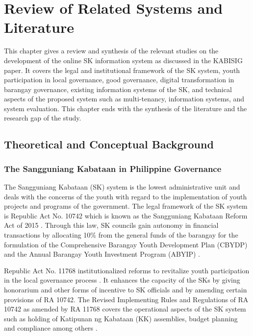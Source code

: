 \chapter{Review of Related Systems and Literature}

\hspace*{\parindent}This chapter gives a review and synthesis of the relevant studies on the development of the online SK information system as discussed in the KABISIG paper. It covers the legal and institutional framework of the SK system, youth participation in local governance, good governance, digital transformation in barangay governance, existing information systems of the SK, and technical aspects of the proposed system such as multi-tenancy, information systems, and system evaluation. This chapter ends with the synthesis of the literature and the research gap of the study.
\vspace{5mm}

\section{Theoretical and Conceptual Background}

\subsection{The Sangguniang Kabataan in Philippine Governance}

\hspace*{\parindent}The Sangguniang Kabataan (SK) system is the lowest administrative unit and deals with the concerns of the youth with regard to the implementation of youth projects and programs of the government. The legal framework of the SK system is Republic Act No. 10742 which is known as the Sangguniang Kabataan Reform Act of 2015 \cite{AU}. Through this law, SK councils gain autonomy in financial transactions by allocating 10\% from the general funds of the barangay for the formulation of the Comprehensive Barangay Youth Development Plan (CBYDP) and the Annual Barangay Youth Investment Program (ABYIP) \cite{AV}.
\vspace{5mm}

\hspace*{\parindent}Republic Act No. 11768 institutionalized reforms to revitalize youth participation in the local governance process \cite{AV}. It enhances the capacity of the SKs by giving honorarium and other forms of incentive to SK officials and by amending certain provisions of RA 10742. The Revised Implementing Rules and Regulations of RA 10742 as amended by RA 11768 covers the operational aspects of the SK system such as holding of Katipunan ng Kabataan (KK) assemblies, budget planning and compliance among others \cite{N}.
\vspace{5mm}

